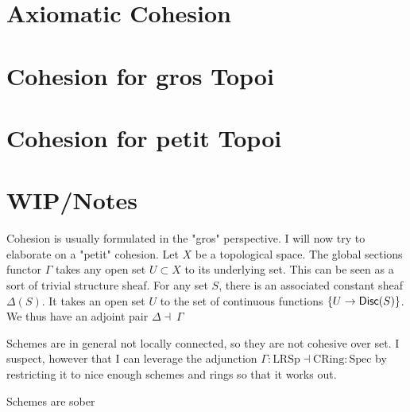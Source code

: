 \section{Axiomatic Cohesion}
\section{Cohesion for gros Topoi}
\section{Cohesion for petit Topoi}
\section{WIP/Notes}
Cohesion is usually formulated in the "gros" perspective. I will now try to elaborate on a "petit" cohesion.
Let $X$ be a topological space. The global sections functor $\Gamma$ takes any open set $U \subset X$ to its underlying set. This can be seen as a sort of trivial structure sheaf. For any set $S$, there is an associated constant sheaf $\Delta(S)$. It takes an open set $U$ to the set of continuous functions $\{U \to \mathsf{Disc}(S)\}$. We thus have an adjoint pair $\Delta \dashv\ \Gamma$

Schemes are in general not locally connected, so they are not cohesive over set. I suspect, however that I can leverage the adjunction $\Gamma: \text{LRSp} \dashv \text{CRing} : \text{Spec}$ by restricting it to nice enough schemes and rings so that it works out.

Schemes are sober